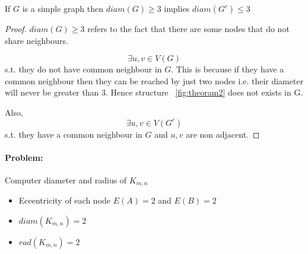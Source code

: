\begin{theorem} If $G$ is a simple graph then $diam(G) \geq 3$ implies $diam(G^c) \leq 3$
\end{theorem}
\begin{proof}
$diam(G) \geq 3$ refers to the fact that there are some nodes that do not share neighbours.

\begin{equation}
    {\textstyle \exists u,v \in V(G)}
 \end{equation}  s.t. they do not have common neighbour in $G$. This is because if they have a common neighbour then they can be reached by just two nodes i.e. their diameter will never be greater than 3. Hence structure ~\ref{fig:theoram2} does not exists in G.

Also,
\begin{equation}
    {\textstyle \exists u,v \in V(G^c)}
\end{equation} s.t. they have a common neighbour in $G$ and $u,v$ are non adjacent.
\end{proof}


\paragraph{Problem:}Computer diameter and radius of $K_{m,n}$ \begin{itemize}
    \item Eceentricity of each node $E(A) = 2$ and $E(B) = 2$ 
    \item $diam(K_{m,n}) = 2 $
    \item $rad(K_{m,n}) = 2 $
\end{itemize}



